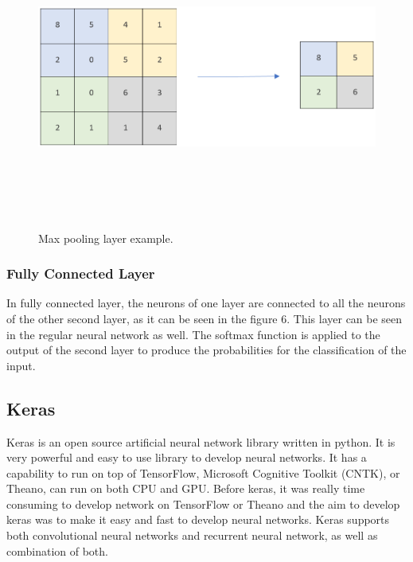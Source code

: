 \begin{figure}[htpb]
	\centering
	\includegraphics[width=12cm,height=10cm,keepaspectratio=true]{images/maxpool}
	\caption{
		Max pooling layer example.
	}
	\label{fig:maxpool}
\end{figure}

\subsubsection{Fully Connected Layer}
In fully connected layer, the neurons of one layer are connected to all the neurons of the other second layer, as it can be seen in the figure 6. This layer can be seen in the regular neural network as well. The softmax function is applied to the output of the second layer to produce the probabilities for the classification of the input. 

\subsection{Keras}

Keras is an open source artificial neural network library written in python. It is very powerful and easy to use library to develop neural networks. It has a capability to run on top of TensorFlow, Microsoft Cognitive Toolkit (CNTK), or Theano, can run on both CPU and GPU. Before keras, it was really time consuming to develop network on TensorFlow or Theano and the aim to develop keras was to make it easy and fast to develop neural networks. Keras supports both convolutional neural networks and recurrent neural network, as well as combination of both.

